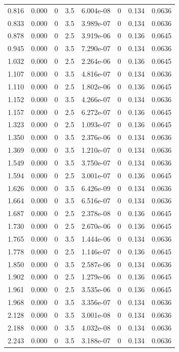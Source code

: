 \documentclass[preview]{standalone}
\begin{document}
{{\begin{tabular}{L{1.2cm}C{1.2cm} C{0.3cm}C{0.5cm} C{1.4cm}C{1.4cm} C{1.4cm}C{1.4cm}}
  0.816  &  0.000  & 0     & 3.5 &  6.004e-08  & 0  & 0.134 &  0.0636   \\ 
  0.833  &  0.000  & 0     & 3.5 &  3.989e-07  & 0  & 0.134 &  0.0636   \\ 
  0.878  &  0.000  & 0     & 2.5 &  3.919e-06  & 0  & 0.136 &  0.0645   \\ 
  0.945  &  0.000  & 0     & 3.5 &  7.290e-07  & 0  & 0.134 &  0.0636   \\ 
  1.032  &  0.000  & 0     & 2.5 &  2.264e-06  & 0  & 0.136 &  0.0645   \\ 
  1.107  &  0.000  & 0     & 3.5 &  4.816e-07  & 0  & 0.134 &  0.0636   \\ 
  1.110  &  0.000  & 0     & 2.5 &  1.802e-06  & 0  & 0.136 &  0.0645   \\ 
  1.152  &  0.000  & 0     & 3.5 &  4.266e-07  & 0  & 0.134 &  0.0636   \\ 
  1.157  &  0.000  & 0     & 2.5 &  6.272e-07  & 0  & 0.136 &  0.0645   \\ 
  1.323  &  0.000  & 0     & 2.5 &  1.093e-07  & 0  & 0.136 &  0.0645   \\ 
  1.350  &  0.000  & 0     & 3.5 &  2.376e-06  & 0  & 0.134 &  0.0636   \\ 
  1.369  &  0.000  & 0     & 3.5 &  1.210e-07  & 0  & 0.134 &  0.0636   \\ 
  1.549  &  0.000  & 0     & 3.5 &  3.750e-07  & 0  & 0.134 &  0.0636   \\ 
  1.594  &  0.000  & 0     & 2.5 &  3.001e-07  & 0  & 0.136 &  0.0645   \\ 
  1.626  &  0.000  & 0     & 3.5 &  6.426e-09  & 0  & 0.134 &  0.0636   \\ 
  1.664  &  0.000  & 0     & 3.5 &  6.516e-07  & 0  & 0.134 &  0.0636   \\ 
  1.687  &  0.000  & 0     & 2.5 &  2.378e-08  & 0  & 0.136 &  0.0645   \\ 
  1.730  &  0.000  & 0     & 2.5 &  2.670e-06  & 0  & 0.136 &  0.0645   \\ 
  1.765  &  0.000  & 0     & 3.5 &  1.444e-06  & 0  & 0.134 &  0.0636   \\ 
  1.778  &  0.000  & 0     & 2.5 &  1.146e-07  & 0  & 0.136 &  0.0645   \\ 
  1.850  &  0.000  & 0     & 3.5 &  2.587e-06  & 0  & 0.134 &  0.0636   \\ 
  1.902  &  0.000  & 0     & 2.5 &  1.279e-06  & 0  & 0.136 &  0.0645   \\ 
  1.961  &  0.000  & 0     & 2.5 &  3.535e-06  & 0  & 0.136 &  0.0645   \\ 
  1.968  &  0.000  & 0     & 3.5 &  3.356e-07  & 0  & 0.134 &  0.0636   \\ 
  2.128  &  0.000  & 0     & 3.5 &  3.001e-08  & 0  & 0.134 &  0.0636   \\ 
  2.188  &  0.000  & 0     & 3.5 &  4.032e-08  & 0  & 0.134 &  0.0636   \\ 
  2.243  &  0.000  & 0     & 3.5 &  3.188e-07  & 0  & 0.134 &  0.0636   \\ 
\hline 
\end{tabular} 

}}
\end{document}

